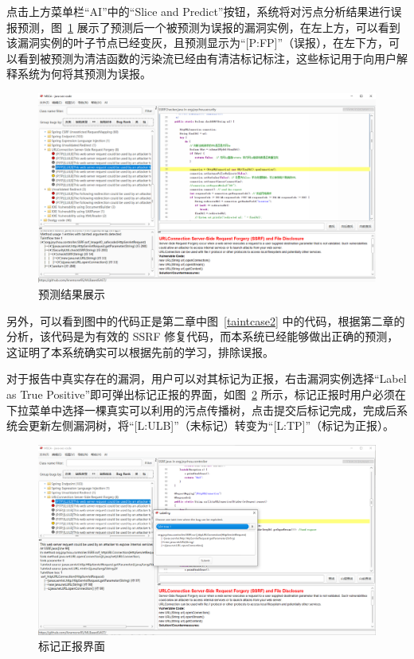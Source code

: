 点击上方菜单栏“AI”中的“Slice and Predict”按钮，系统将对污点分析结果进行误报预测，图~\ref{show:predictResult} 展示了预测后一个被预测为误报的漏洞实例，在左上方，可以看到该漏洞实例的叶子节点已经变灰，且预测显示为“[P:FP]”（误报），在左下方，可以看到被预测为清洁函数的污染流已经由有清洁标记标注，这些标记用于向用户解释系统为何将其预测为误报。

\begin{figure}[H]
    \centering
    \includegraphics[width=0.8\linewidth]{FIGs/chapter4/predictResult.png}
    \caption{预测结果展示}\label{show:predictResult}
\end{figure}

另外，可以看到图中的代码正是第二章中图~\ref{taintcase2} 中的代码，根据第二章的分析，该代码是为有效的 SSRF 修复代码，而本系统已经能够做出正确的预测，这证明了本系统确实可以根据先前的学习，排除误报。

对于报告中真实存在的漏洞，用户可以对其标记为正报，右击漏洞实例选择“Label as True Positive”即可弹出标记正报的界面，如图~\ref{show:labelTP} 所示，标记正报时用户必须在下拉菜单中选择一棵真实可以利用的污点传播树，点击提交后标记完成，完成后系统会更新左侧漏洞树，将“[L:ULB]”（未标记）转变为“[L:TP]”（标记为正报）。

\begin{figure}[H]
    \centering
    \includegraphics[width=0.8\linewidth]{FIGs/chapter4/labelTP.png}
    \caption{标记正报界面}\label{show:labelTP}
\end{figure}

